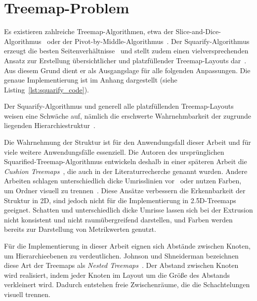 \section{Treemap-Problem} \label{sec:TreemapProblem}

Es existieren zahlreiche Treemap-Algorithmen, etwa der Slice-and-Dice-Al\-go\-rith\-mus~\cite{asahi1995using} oder der Pivot-by-Middle-Algorithmus~\cite{shneiderman2001ordered}. Der Squarify-Algorithmus erzeugt die besten Seitenverhältnisse~\cite{shneiderman2001ordered} und stellt zudem einen vielversprechenden Ansatz zur Erstellung übersichtlicher und platzfüllender Treemap-Layouts dar~\cite{bruls2000squarified}. Aus diesem Grund dient er als Ausgangslage für alle folgenden Anpassungen. Die genaue Implementierung ist im Anhang dargestellt (siehe Listing~\ref{lst:squarify_code}).

Der Squarify-Algorithmus und generell alle platzfüllenden Treemap-Layouts weisen eine Schwäche auf, nämlich die erschwerte Wahrnehmbarkeit der zugrunde liegenden Hierarchiestruktur~\cite{lu2008cascaded}.

Die Wahrnehmung der Struktur ist für den Anwendungsfall dieser Arbeit und für viele weitere Anwendungsfälle essenziell. Die Autoren des ursprünglichen Squarified-Treemap-Algorithmus entwickeln deshalb in einer späteren Arbeit die \textit{Cushion Treemaps}~\cite{cushionTreemaps}, die auch in der Literaturrecherche genannt wurden. Andere Arbeiten schlagen unterschiedlich dicke Umrisslinien vor~\cite{largeHierarchicalRepositories, 2010-perception-treemaps} oder nutzen Farben, um Ordner visuell zu trennen~\cite{d3_treemap_doku}. Diese Ansätze verbessern die Erkennbarkeit der Struktur in 2D, sind jedoch nicht für die Implementierung in 2{.}5D-Treemaps geeignet. Schatten und unterschiedlich dicke Umrisse lassen sich bei der Extrusion nicht konsistent und nicht raumübergreifend darstellen, und Farben werden bereits zur Darstellung von Metrikwerten genutzt.

Für die Implementierung in dieser Arbeit eignen sich Abstände zwischen Knoten, um Hierarchieebenen zu verdeutlichen. Johnson und Shneiderman bezeichnen diese Art der Treemaps als \textit{Nested Treemaps}~\cite{johnson1991tree}. Der Abstand zwischen Knoten wird realisiert, indem jeder Knoten im Layout um die Größe des Abstands verkleinert wird. Dadurch entstehen freie Zwischenräume, die die Schachtelungen visuell trennen.

